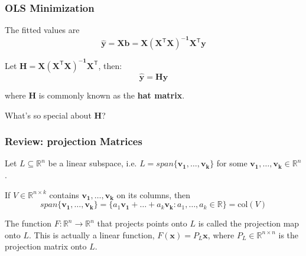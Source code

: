\documentclass[12pt]{beamer}\usepackage[]{graphicx}\usepackage[]{color}
\makeatletter
\newcommand{\hlcom}[1]{\textcolor[rgb]{0.678,0.584,0.686}{\textit{#1}}}%
\newcommand{\hlopt}[1]{\textcolor[rgb]{0,0,0}{#1}}%
\newcommand{\hlstd}[1]{\textcolor[rgb]{0.345,0.345,0.345}{#1}}%
\newcommand{\hlkwb}[1]{\textcolor[rgb]{0.69,0.353,0.396}{#1}}%
\newcommand{\hlkwd}[1]{\textcolor[rgb]{0.737,0.353,0.396}{\textbf{#1}}}%
\newenvironment{kframe}{%
 \def\at@end@of@kframe{}%
 \ifinner\ifhmode%
  \def\at@end@of@kframe{\end{minipage}}%
  \begin{minipage}{\columnwidth}%
 \fi\fi%
 \def\FrameCommand##1{\hskip\@totalleftmargin \hskip-\fboxsep
 \colorbox{shadecolor}{##1}\hskip-\fboxsep
     \hskip-\linewidth \hskip-\@totalleftmargin \hskip\columnwidth}%
 \MakeFramed {\advance\hsize-\width
   \@totalleftmargin\z@ \linewidth\hsize
   \@setminipage}}%
 {\par\unskip\endMakeFramed%
 \at@end@of@kframe}
\newenvironment{knitrout}{}{} %
\makeatother
\begin{document}

\begin{frame}
\frametitle{OLS Minimization}

The fitted values are
$$
\mathbf{\hat{y}} = \mathbf{X b} = 
\mathbf{X (X^{\mathsf{T}} X)^{-1} X^{\mathsf{T}} y}
$$

Let $\mathbf{H} = \mathbf{X (X^{\mathsf{T}} X)^{-1} X^{\mathsf{T}}}$, then:
$$
\mathbf{\hat{y}} = \mathbf{Hy}
$$

where $\mathbf{H}$ is commonly known as the {\hilit \textbf{hat matrix}}.

\bigskip
{\mdlit What's so special about $\mathbf{H}$?}

\end{frame}




\begin{frame}
\frametitle{Review: projection Matrices}

Let $L \subseteq \mathbb{R}^n$ be a {\hilit linear subspace}, 
i.e. $L = span\{ \mathbf{v_1, \dots, v_k} \}$ for some 
$\mathbf{v_1, \dots, v_k} \in \mathbb{R}^n$.

\bigskip
If $V \in \mathbb{R}^{n \times k}$ contains $\mathbf{v_1, \dots, v_k}$ on its columns, then
$$
span \{ \mathbf{v_1, \dots, v_k} \} = \{ a_1 \mathbf{v_1} + \dots + a_k \mathbf{v_k} : a_1, \dots, a_k \in \mathbb{R} \} = \mathrm{col}(V)
$$

The function $F: \mathbb{R}^n \rightarrow \mathbb{R}^n$ that projects points onto $L$
is called the {\hilit projection map} onto $L$. This is actually a linear function,
$F(\mathbf{x}) = P_L \mathbf{x}$, where $P_L \in \mathbb{R}^{n \times n}$ is the 
{\hilit projection matrix} onto $L$.

\end{frame}
\end{document}
